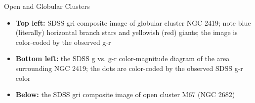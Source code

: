 \documentclass[letterpaper,landscape]{slides}
\begin{document}
\begin{slide}
{\begin{minipage}[t]{9cm}
\begin{center}
\end{center}
\end{minipage}

\begin{minipage}[t]{15cm}
\begin{center}
\vskip -1in
{\large \color{red} Open and Globular Clusters}
\end{center}


\begin{itemize}
\item {\bf Top left:} SDSS gri composite image of globular cluster NGC 2419;
         note blue (literally) horizontal branch stars and yellowish (red)
         giants; the image is color-coded by the observed  g-r
\item {\bf Bottom left:} the SDSS g vs. g-r color-magnitude diagram of the area 
       surrounding NGC 2419; the dots are
       color-coded by the observed SDSS g-r color
\item {\bf Below:} the SDSS gri composite image of open cluster M67 (NGC 2682)
\end{itemize}
\vskip 0.0in

\end{minipage}}
\vfill 
\end{slide}
\end{document}
